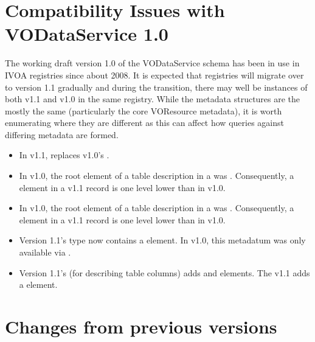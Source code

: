 \documentclass[11pt,a4paper]{ivoa}
\begin{document}
\appendix

\section{Compatibility Issues with VODataService 1.0}
\label{vods10-compat}

The working draft version 1.0 of the VODataService schema has been in
use in IVOA registries since about 2008.  It is expected that
registries will migrate over to version 1.1 gradually and during the
transition, there may well be instances of both v1.1 and v1.0 in the
same registry.  While the metadata structures are the mostly the same
(particularly the core VOResource metadata), it is worth enumerating
where they are different as this can affect how queries against
differing metadata are formed.

\begin{itemize}
\item In v1.1,  replaces v1.0's
       . 

\item In v1.0, the root element of a table description in a
        was
       .  Consequently, a
        element in a v1.1 record is one
       level lower than in v1.0.  

\item In v1.0, the root element of a table description in a
        was
       .  Consequently, a
        element in a v1.1 record is one
       level lower than in v1.0.  

\item Version 1.1's  type now
       contains a  element.  In
       v1.0, this metadatum was only available via
       .
       

\item Version 1.1's  (for describing table
       columns) adds  and
        elements.  The v1.1
        adds a 
       element. 
       
\end{itemize}


\section{Changes from previous versions}
\end{document}
